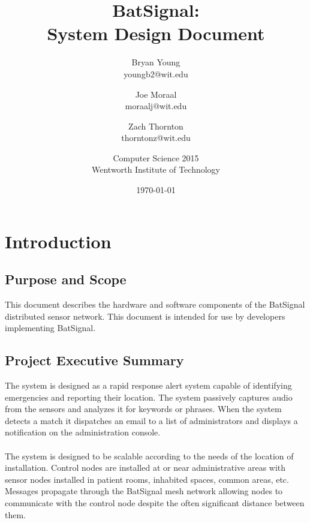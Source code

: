\documentclass[11pt,a4paper]{article}
\begin{document}
\title{BatSignal:\\System Design Document}
\author{
	Bryan Young\\youngb2@wit.edu \and
	Joe Moraal\\moraalj@wit.edu\\ \and
	Zach Thornton\\thorntonz@wit.edu \and
	Computer Science 2015 \\
	Wentworth Institute of Technology
}
\date{\today}

\maketitle
\newpage

\tableofcontents{}
\newpage


\section{Introduction}

\subsection{Purpose and Scope}
This document describes the hardware and software components of the BatSignal distributed sensor network. This document is intended for use by developers implementing BatSignal.

\subsection{Project Executive Summary}
The system is designed as a rapid response alert system capable of identifying emergencies and reporting their location. The system passively captures audio from the sensors and analyzes it for keywords or phrases. When the system detects a match it dispatches an email to a list of administrators and displays a notification on the administration console. \\\\
The system is designed to be scalable according to the needs of the location of installation. Control nodes are installed at or near administrative areas with sensor nodes installed in patient rooms, inhabited spaces, common areas, etc. Messages propagate through the BatSignal mesh network allowing nodes to communicate with the control node despite the often significant distance between them.
\end{document}
